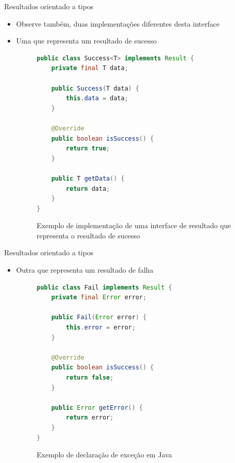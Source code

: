 \documentclass[brazilian]{beamer}
\begin{document}
\begin{frame}[fragile]{Resultados orientado a tipos}
    \begin{itemize}
        \item Observe também, duas implementações diferentes desta interface
        \item Uma que representa um resultado de sucesso
        \begin{figure}[H]
            \centering
            \begin{lstlisting}[language=Java]
public class Success<T> implements Result {
    private final T data;

    public Success(T data) {
        this.data = data;
    }

    @Override
    public boolean isSuccess() {
        return true;
    }

    public T getData() {
        return data;
    }
}
            \end{lstlisting}
            \caption{Exemplo de implementação de uma interface de resultado que representa o resultado de sucesso}
            \label{fig:java_success_result_implementation}
        \end{figure}
    \end{itemize}
\end{frame}

\begin{frame}[fragile]{Resultados orientado a tipos}
    \begin{itemize}
        \item Outra que representa um resultado de falha
        \begin{figure}[H]
            \centering
            \begin{lstlisting}[language=Java]
public class Fail implements Result {
    private final Error error;
    
    public Fail(Error error) {
        this.error = error;
    }
    
    @Override
    public boolean isSuccess() {
        return false;
    }

    public Error getError() {
        return error;
    }
}
            \end{lstlisting}
            \caption{Exemplo de declaração de exceção em Java}
            \label{fig:java_fail_result_implementation}
        \end{figure}
    \end{itemize}
\end{frame}
\end{document}
